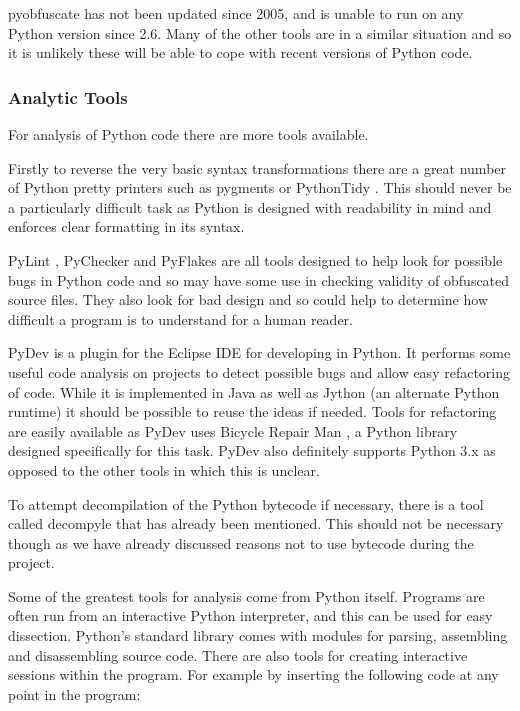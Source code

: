 \documentclass{report}
\begin{document}
pyobfuscate has not been updated since 2005, and is unable to run on any Python version since 2.6. Many of the other tools are in
a similar situation and so it is unlikely these will be able to cope with recent versions of Python code.

\subsubsection{Analytic Tools}

For analysis of Python code there are more tools available.

Firstly to reverse the very basic syntax transformations there are a great number of Python pretty printers such as
pygments \cite{pygments} or PythonTidy \cite{pythontidy}. This should never be a particularly difficult task as Python is
designed with readability in mind and enforces clear formatting in its syntax.

PyLint \cite{pylint}, PyChecker \cite{pychecker} and PyFlakes \cite{pyflakes} are all tools designed to help look for possible
bugs in Python code and so may have some use in checking validity of obfuscated source files. They also look for bad design and so
could help to determine how difficult a program is to understand for a human reader.

PyDev \cite{pydev} is a plugin for the Eclipse IDE for developing in Python. It performs some useful code analysis on projects to detect
possible bugs and allow easy refactoring of code. While it is implemented in Java as well as Jython (an alternate Python runtime)
it should be possible to reuse the ideas if needed. Tools for refactoring are easily available as PyDev uses Bicycle Repair
Man \cite{bikerepair}, a Python library designed specifically for this task. PyDev also definitely supports Python 3.x as opposed to the
other tools in which this is unclear.

To attempt decompilation of the Python bytecode if necessary, there is a tool called decompyle \cite{decompyle} that has already been
mentioned. This should not be necessary though as we have already discussed reasons not to use bytecode during the project.

Some of the greatest  tools for analysis come from Python itself. Programs are often run from an interactive Python interpreter, and this
can be used for easy dissection. Python's standard library comes with modules for parsing, assembling and disassembling source code.
There are also tools for creating interactive sessions within the program. For example by inserting the following code at any point
in the program:
\end{document}
